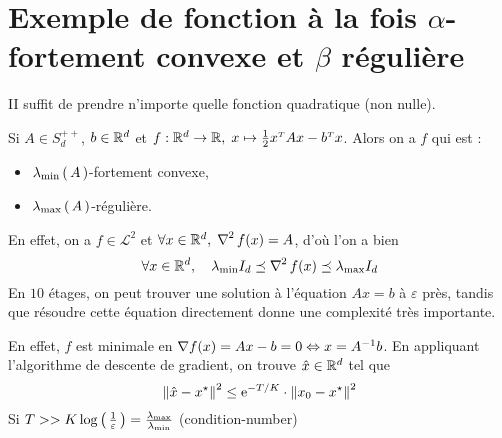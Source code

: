 \section{Exemple de fonction à la fois $\alpha$-fortement convexe et
 $\beta$ régulière}

 II suffit de prendre n'importe quelle fonction quadratique (non nulle).

 Si $A \in S_d^{++}$, $b \in \mathbb{R}^d$ et $f: \mathbb{R}^d \rightarrow \mathbb{R}, \; x \mapsto \frac{1}{2} x^{\scriptscriptstyle T}Ax-b^{\scriptscriptstyle T}x$.
 Alors on a $f$ qui est :
 \begin{itemize}
   \item $\lambda_{\min}\left( \, A \, \right)$-fortement convexe,
   \item $\lambda_{\max}\left( \, A \, \right)$-régulière.
 \end{itemize}

 En effet, on a $f \in \mathcal{L}^2$ et $ \forall x \in \mathbb{R}^d, \; \operatorname{\nabla\!}^{\,2}f(x) = A$,
 d'où l'on a bien
 \begin{equation*}
   \forall x \in \mathbb{R}^d, \quad \lambda_{\min} I_d \preceq  \operatorname{\nabla\!}^{\,2}f(x) \preceq
   \lambda_{\max} I_d
 \end{equation*}
 En $10$ étages, on peut trouver une solution à l'équation $Ax= b$ à $\varepsilon$
 près, tandis que résoudre cette équation directement donne une complexité très importante.

 En effet, $f$ est minimale en $\operatorname{\nabla\!} f(x) = Ax-b = 0 \Leftrightarrow x=A^{-1}b$.
 En appliquant l'algorithme de descente de gradient, on trouve $\hat{x} \in \mathbb{R}^d$ tel que
 \begin{equation*}
\norme{\xhat - \xopt}^2 \leq \e^{-T/K}\cdot \norme{x_0-\xopt}^2
 \end{equation*}
 Si $T >> K \log \left( \, \frac{1}{\varepsilon} \, \right) = \frac{\lambda_{\max}}{\lambda_{\min}}$ (condition-number)
